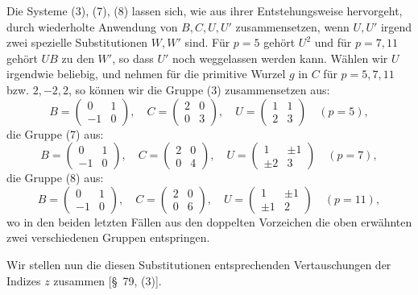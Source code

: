 \documentclass[11pt]{article}
\begin{document}
Die Systeme (3), (7), (8) lassen sich, wie aus ihrer Entstehungsweise hervorgeht, durch wiederholte Anwendung von $B,C,U,U'$ zusammensetzen, wenn $U,U'$ irgend zwei spezielle Substitutionen $W,W'$ sind. Für $p=5$ gehört $U^2$ und für $p=7,11$ gehört $UB$ zu den $W'$, so dass $U'$ noch weggelassen werden kann. Wählen wir $U$ irgendwie beliebig, und nehmen für die primitive Wurzel $g$ in $C$ für $p=5,7,11$ bzw. $2,-2,2$, so können wir die Gruppe (3) zusammensetzen aus:
\[
 B=\begin{pmatrix}0&1\\-1&0\end{pmatrix},\quad
 C=\begin{pmatrix}2&0\\0&3\end{pmatrix},\quad
 U=\begin{pmatrix}1&1\\2&3\end{pmatrix}\quad(p=5),
\]
die Gruppe (7) aus:
\[
 B=\begin{pmatrix}0&1\\-1&0\end{pmatrix},\quad
 C=\begin{pmatrix}2&0\\0&4\end{pmatrix},\quad
 U=\begin{pmatrix}1&\pm1\\ \pm2&3\end{pmatrix}\quad(p=7),
\]
die Gruppe (8) aus:
\[
 B=\begin{pmatrix}0&1\\-1&0\end{pmatrix},\quad
 C=\begin{pmatrix}2&0\\0&6\end{pmatrix},\quad
 U=\begin{pmatrix}1&\pm1\\ \pm1&2\end{pmatrix}\quad(p=11),
\]
wo in den beiden letzten Fällen aus den doppelten Vorzeichen die oben erwähnten zwei verschiedenen Gruppen entspringen.

Wir stellen nun die diesen Substitutionen entsprechenden Vertauschungen der Indizes $z$ zusammen [\S~79, (3)].
\end{document}
